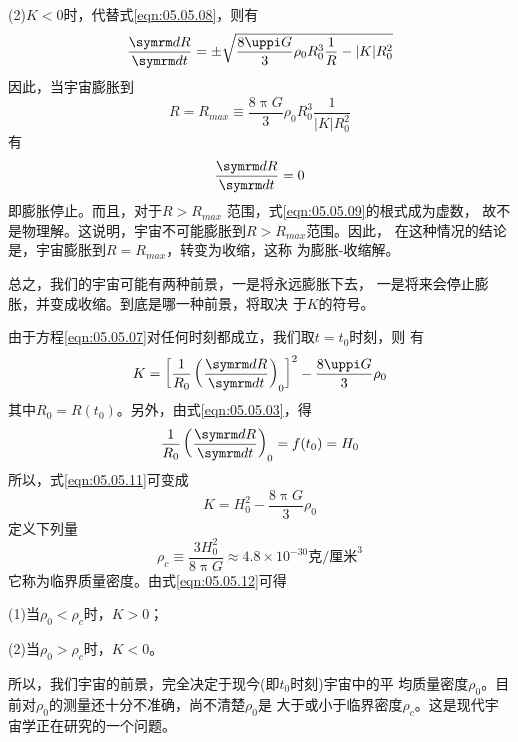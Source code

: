 (2)$ K < 0 $时，代替式\eqref{eqn:05.05.08}，则有
\begin{equation}\label{eqn:05.05.09}
 \frac { \dif R } { \dif t } = \pm \sqrt { \frac { 8 \uppi G } { 3 } \rho _ { 0 } R _ { 0 } ^ { 3 } \frac { 1 } { R } - | K | R _ 0 ^ { 2 } }
\end{equation}
因此，当宇宙膨胀到
\begin{equation}\label{eqn:05.05.10}
 R = R _ { max } \equiv \frac { 8 \uppi G } { 3 } \rho _ { 0 } R _ { 0 } ^ { 3 } \frac { 1 } { | K | R _ { 0 } ^ 2 }
\end{equation}
有
\begin{equation*}
 \frac { \dif R } { \dif t } = 0
\end{equation*}
即膨胀停止。而且，对于$ R > R _ { max } $ 范围，式\eqref{eqn:05.05.09}的根式成为虚数，
故不是物理解。这说明，宇宙不可能膨胀到$ R > R _ { max } $范围。因此，
在这种情况的结论是，宇宙膨胀到$ R = R _ { max } $，转变为收缩，这称
为膨胀-收缩解。

总之，我们的宇宙可能有两种前景，一是将永远膨胀下去，
一是将来会停止膨胀，并变成收缩。到底是哪一种前景，将取决
于$ K $的符号。

由于方程\eqref{eqn:05.05.07}对任何时刻都成立，我们取$ t=t_0 $时刻，则
有
\begin{equation}\label{eqn:05.05.11}
 K = \left[ \frac { 1 } { R _ { 0 } } \left( \frac { \dif R } { \dif t } \right) _ 0 \right] ^ { 2 } - \frac { 8 \uppi G } { 3 } \rho _ { 0 }
\end{equation}
其中$ R _ { 0 } = R ( t _ { 0 } ) $。另外，由式\eqref{eqn:05.05.03}，得
\begin{equation*}
 \frac { 1 } { R _ { 0 } } \left( \frac { \dif R } { \dif t } \right) _ { 0 } = f ( t _ { 0 } ) = H _ { 0 }
\end{equation*}
所以，式\eqref{eqn:05.05.11}可变成
\clearpage
\begin{equation}\label{eqn:05.05.12}
 K = H _ 0 ^ { 2 } - \frac { 8 \uppi G } { 3 } \rho _ { 0 }
\end{equation}
定义下列量
\begin{equation*}
 \rho _ { c } \equiv \frac { 3 H _ 0 ^ { 2 } } { 8 \uppi G } \approx 4.8 \times 10 ^ { -30 } \text{克/厘米} ^ 3
\end{equation*}
它称为临界质量密度。由式\eqref{eqn:05.05.12}可得

(1)当$ \rho _ { 0 } < \rho _ { c } $时，$ K > 0 $；

(2)当$ \rho _ { 0 } > \rho _ { c } $时，$ K < 0 $。

\noindent 所以，我们宇宙的前景，完全决定于现今(即$ t _ { 0 } $时刻)宇宙中的平
均质量密度$ \rho _ { 0 } $。目前对$ \rho _ { 0 } $的测量还十分不准确，尚不清楚$ \rho _ { 0 } $是
大于或小于临界密度$ \rho _ { c } $。这是现代宇宙学正在研究的一个问题。